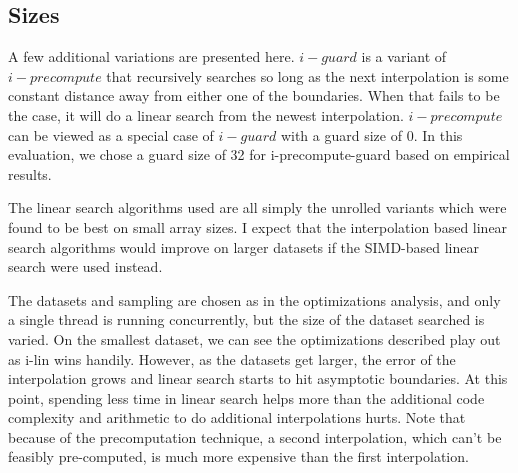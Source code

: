 \documentclass[twocolumn]{article}
\begin{document}
\begin{figure}
\end{figure}

\subsection{Sizes}
A few additional variations are presented here. $i-guard$ is a variant of $i-precompute$ that recursively searches so long as the next interpolation is some constant distance away from either one of the boundaries. When that fails to be the case, it will do a linear search from the newest interpolation. $i-precompute$ can be viewed as a special case of $i-guard$ with a guard size of 0. In this evaluation, we chose a guard size of 32 for i-precompute-guard based on empirical results.

The linear search algorithms used are all simply the unrolled variants which were found to be best on small array sizes. I expect that the interpolation based linear search algorithms would improve on larger datasets if the SIMD-based linear search were used instead.

The datasets and sampling are chosen as in the optimizations analysis, and only a single thread is running concurrently, but the size of the dataset searched is varied. On the smallest dataset, we can see the optimizations described play out as i-lin wins handily. However, as the datasets get larger, the error of the interpolation grows and linear search starts to hit asymptotic boundaries. At this point, spending less time in linear search helps more than the additional code complexity and arithmetic to do additional interpolations hurts. Note that because of the precomputation technique, a second interpolation, which can't be feasibly pre-computed, is much more expensive than the first interpolation.
\end{document}
